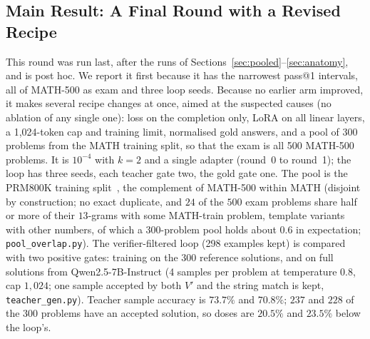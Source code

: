 \documentclass[runningheads]{llncs}
\begin{document}
\subsection{Main Result: A Final Round with a Revised Recipe}
\label{sec:final}
This round was run last, after the runs of
Sections~\ref{sec:pooled}--\ref{sec:anatomy}, and is post hoc. We report it
first because it has the narrowest pass@1 intervals, all of MATH-500 as exam
and three loop seeds. Because no earlier arm improved, it makes several recipe
changes at once, aimed at the suspected causes (no ablation of any single one): loss on the completion only, LoRA on all linear layers,
a 1,024-token cap and training limit, normalised gold answers, and a pool of
300 problems from the MATH training split, so that the exam is all 500
MATH-500 problems. It is $10^{-4}$ with $k=2$ and a single adapter (round~0 to round~1); the loop has three seeds, each teacher gate two, the gold gate one. The pool is the PRM800K training split~\cite{ref_prm800k}, the complement of MATH-500 within MATH (disjoint by construction; no exact duplicate, and $24$ of the $500$ exam problems share half or more of their $13$-grams with some MATH-train problem, template variants with other numbers, of which a $300$-problem pool holds about $0.6$ in expectation; \texttt{pool\_overlap.py}). The
verifier-filtered loop (298 examples kept) is compared with two positive gates: training on the 300
reference solutions, and on full solutions from Qwen2.5-7B-Instruct (4 samples per problem at temperature $0.8$, cap $1{,}024$; one sample accepted by both $V'$ and the string match is kept, \texttt{teacher\_gen.py}). Teacher sample accuracy is $73.7\%$ and $70.8\%$; $237$ and $228$ of the $300$ problems have an accepted solution, so doses are $20.5\%$ and $23.5\%$ below the loop's. 
\end{document}
